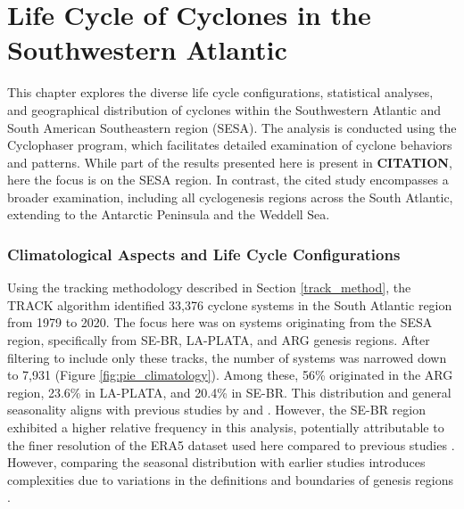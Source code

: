 \chapter{Life Cycle of Cyclones in the Southwestern Atlantic}

This chapter explores the diverse life cycle configurations, statistical analyses, and geographical distribution of cyclones within the Southwestern Atlantic and South American Southeastern region (SESA). The analysis is conducted using the Cyclophaser program, which facilitates detailed examination of cyclone behaviors and patterns. While part of the results presented here is present in \textbf{CITATION}, here the focus is on the SESA region. In contrast, the cited study encompasses a broader examination, including all cyclogenesis regions across the South Atlantic, extending to the Antarctic Peninsula and the Weddell Sea.


\subsection{Climatological Aspects and Life Cycle Configurations}

Using the tracking methodology described in Section \ref{track_method}, the TRACK algorithm identified 33,376 cyclone systems in the South Atlantic region from 1979 to 2020. The focus here was on systems originating from the SESA region, specifically from SE-BR, LA-PLATA, and ARG genesis regions. After filtering to include only these tracks, the number of systems was narrowed down to 7,931 (Figure \ref{fig:pie_climatology}). Among these, 56\% originated in the ARG region, 23.6\% in LA-PLATA, and 20.4\% in SE-BR. This distribution and general seasonality aligns with previous studies by \citet{gramcianinov2019properties} and \citet{crespo2021potential}. However, the SE-BR region exhibited a higher relative frequency in this analysis, potentially attributable to the finer resolution of the ERA5 dataset used here compared to previous studies \citep{gramcianinov2020analysis}. However, comparing the seasonal distribution with earlier studies introduces complexities due to variations in the definitions and boundaries of genesis regions \citep[e.g.,]{reboita2010regimes, crespo2021potential}.

